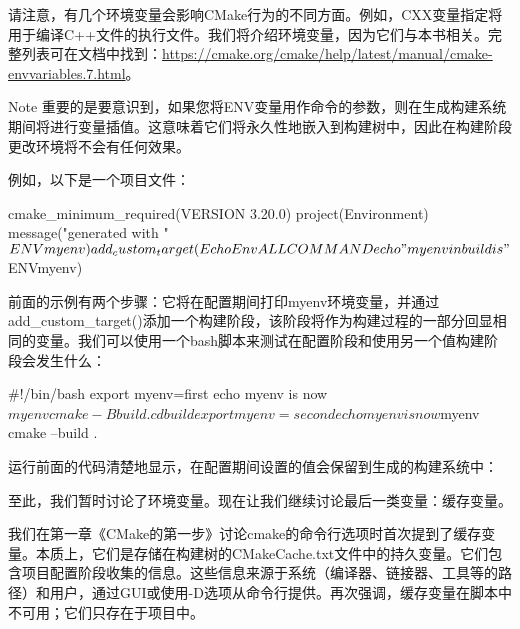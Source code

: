 请注意，有几个环境变量会影响CMake行为的不同方面。例如，CXX变量指定将用于编译C++文件的执行文件。我们将介绍环境变量，因为它们与本书相关。完整列表可在文档中找到：\url{https://cmake.org/cmake/help/latest/manual/cmake-envvariables.7.html}。

\begin{myNotic}{Note}
重要的是要意识到，如果您将ENV变量用作命令的参数，则在生成构建系统期间将进行变量插值。这意味着它们将永久性地嵌入到构建树中，因此在构建阶段更改环境将不会有任何效果。
\end{myNotic}

例如，以下是一个项目文件：


\begin{cmake}
cmake_minimum_required(VERSION 3.20.0)
project(Environment)
message("generated with " $ENV{myenv})
add_custom_target(EchoEnv ALL COMMAND echo "myenv in build
  is" $ENV{myenv})
\end{cmake}

前面的示例有两个步骤：它将在配置期间打印myenv环境变量，并通过add\_custom\_target()添加一个构建阶段，该阶段将作为构建过程的一部分回显相同的变量。我们可以使用一个bash脚本来测试在配置阶段和使用另一个值构建阶段会发生什么：


\begin{shell}
#!/bin/bash
export myenv=first
echo myenv is now $myenv
cmake -B build .
cd build
export myenv=second
echo myenv is now $myenv
cmake --build .
\end{shell}

运行前面的代码清楚地显示，在配置期间设置的值会保留到生成的构建系统中：


至此，我们暂时讨论了环境变量。现在让我们继续讨论最后一类变量：缓存变量。


我们在第一章《CMake的第一步》讨论cmake的命令行选项时首次提到了缓存变量。本质上，它们是存储在构建树的CMakeCache.txt文件中的持久变量。它们包含项目配置阶段收集的信息。这些信息来源于系统（编译器、链接器、工具等的路径）和用户，通过GUI或使用-D选项从命令行提供。再次强调，缓存变量在脚本中不可用；它们只存在于项目中。

